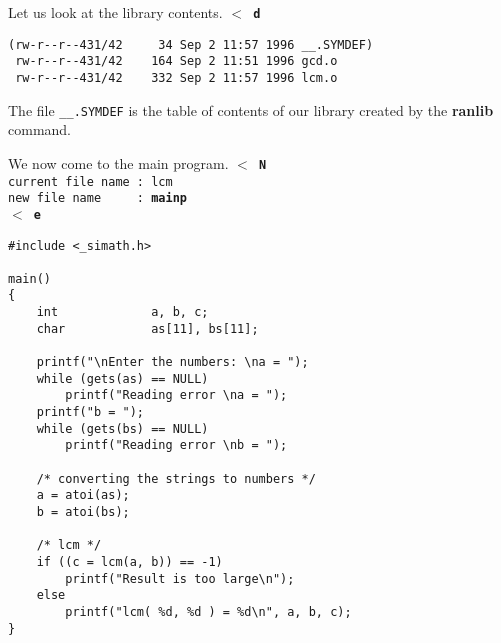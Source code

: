\newpage

Let us look at the library contents.
\leer
{\tt $<$ {\bf d} \care}
\begin{verbatim}
(rw-r--r--431/42     34 Sep 2 11:57 1996 __.SYMDEF)
 rw-r--r--431/42    164 Sep 2 11:51 1996 gcd.o
 rw-r--r--431/42    332 Sep 2 11:57 1996 lcm.o
\end{verbatim}
The file {\tt \_\_.SYMDEF} is the table of contents of our library created by
the {\bf ranlib} command.

We now come to the main program.
\leer
{\tt $<$ {\bf N} \care \\
current file name : lcm\\
new file  name \ \ \ \ : {\bf mainp}\\
$<$ {\bf e} \care }

\begin{verbatim}
#include <_simath.h>

main()
{
    int             a, b, c;
    char            as[11], bs[11];

    printf("\nEnter the numbers: \na = ");
    while (gets(as) == NULL)
        printf("Reading error \na = ");
    printf("b = ");
    while (gets(bs) == NULL)
        printf("Reading error \nb = ");

    /* converting the strings to numbers */
    a = atoi(as);
    b = atoi(bs);

    /* lcm */
    if ((c = lcm(a, b)) == -1)
        printf("Result is too large\n");
    else
        printf("lcm( %d, %d ) = %d\n", a, b, c);
}

\end{verbatim}

\newpage

